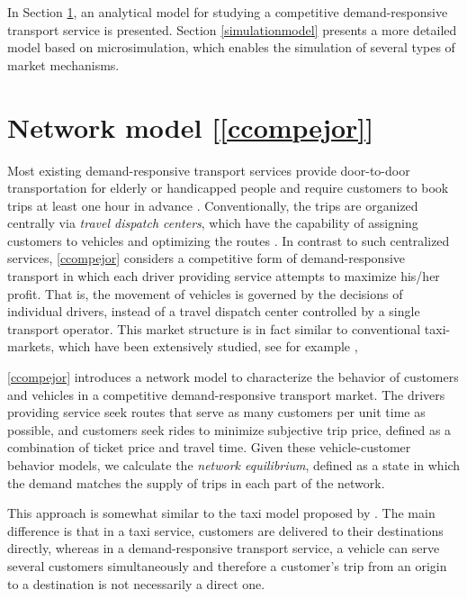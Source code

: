 \documentclass[dissertation,draft*]{aaltoseries}
\begin{document}
In Section \ref{networkmodel}, an analytical model for studying a competitive demand-responsive transport service is presented.
Section \ref{simulationmodel} presents a more detailed model based on microsimulation, which enables the simulation of 
several types of market mechanisms.

\section{Network model [\ref{ccompejor}]}
\label{networkmodel}
Most existing demand-responsive transport services provide door-to-door transportation for elderly or handicapped people
and require customers to book trips at least one hour in advance \citep{cordeau05,jouko}.
Conventionally, the trips are organized centrally via \emph{travel dispatch centers}, which have the capability of
assigning customers to vehicles and optimizing the routes \citep{mageean}.
In contrast to such centralized services, \ref{ccompejor} considers a competitive form of demand-responsive transport in which 
each driver providing service attempts to maximize his/her profit. That is,
the movement of vehicles is governed by the decisions of individual drivers, 
instead of a travel dispatch center controlled by a single transport operator.
This market structure is in fact similar to conventional taxi-markets, which have been extensively studied, see for example 
\citep{hackner1995,arnott1996,cairns1996,flores-guri2003,lagos2003,wong2005,matsushima2006,fernandez2006,moore2006,yang2002,yang2005,yang2010}, 
 
\ref{ccompejor} introduces a network model to characterize the 
behavior of customers and vehicles in a competitive demand-responsive transport market.
The drivers providing service seek routes that serve as many customers per unit time as possible, 
and customers seek rides to minimize subjective trip price, defined as a combination of ticket price and travel time. 
Given these vehicle-customer behavior models, we calculate
the \emph{network equilibrium}, defined as a state in which the demand matches the supply
of trips in each part of the network. 

This approach is somewhat similar to the taxi model proposed by \cite{yang2010}. The main difference is that in a taxi service, 
customers are delivered to their destinations directly, whereas in a demand-responsive transport service, a vehicle can serve several customers 
simultaneously and therefore a customer's trip from an origin to a destination is not necessarily a direct one. 
\end{document}
